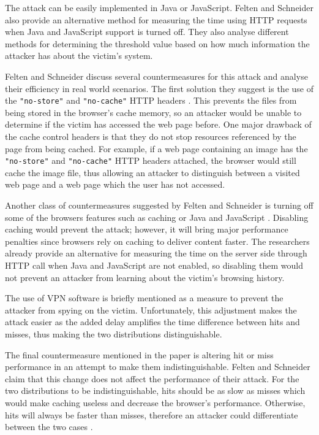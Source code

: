 \documentclass[10pt,a4paper,twoside]{book}
\begin{document}
The attack can be easily implemented in Java or JavaScript. Felten and Schneider also provide an alternative method for measuring the time using HTTP requests when Java and JavaScript support is turned off. They also analyse different methods for determining the threshold value based on how much information the attacker has about the victim's system.

Felten and Schneider discuss several countermeasures for this attack and analyse their efficiency in real world scenarios. The first solution they suggest is the use of the \texttt{"no-store"} and \texttt{"no-cache"} HTTP headers \cite{felten2000timing}. This prevents the files from being stored in the browser's cache memory, so an attacker would be unable to determine if the victim has accessed the web page before. One major drawback of the cache control headers is that they do not stop resources referenced by the page from being cached. For example, if a web page containing an image has the \texttt{"no-store"} and \texttt{"no-cache"} HTTP headers attached, the browser would still cache the image file, thus allowing an attacker to distinguish between a visited web page and a web page which the user has not accessed.

Another class of countermeasures suggested by Felten and Schneider is turning off some of the browsers features such as caching or Java and JavaScript \cite{felten2000timing}. Disabling caching would prevent the attack; however, it will bring major performance penalties since browsers rely on caching to deliver content faster. The researchers already provide an alternative for measuring the time on the server side through HTTP call when Java and JavaScript are not enabled, so disabling them would not prevent an attacker from learning about the victim's browsing history.

The use of VPN software is briefly mentioned as a measure to prevent the attacker from spying on the victim. Unfortunately, this adjustment makes the attack easier as the added delay amplifies the time difference between hits and misses, thus making the two distributions distinguishable. 

The final countermeasure mentioned in the paper is altering hit or miss performance in an attempt to make them indistinguishable. Felten and Schneider claim that this change does not affect the performance of their attack. For the two distributions to be indistinguishable, hits should be as slow as misses which would make caching useless and decrease the browser's performance. Otherwise, hits will always be faster than misses, therefore an attacker could differentiate between the two cases \cite{felten2000timing}. 
\end{document}
